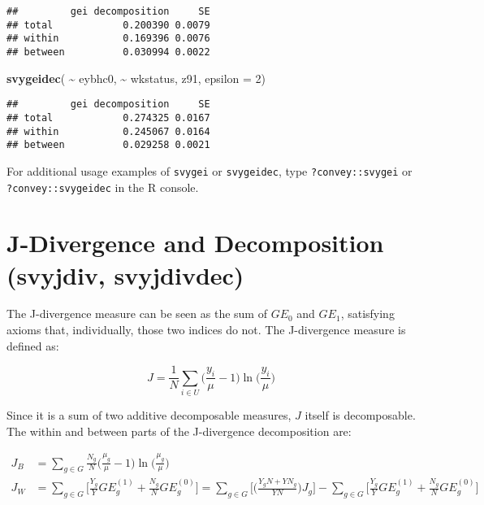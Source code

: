 \documentclass[
]{book}
\newenvironment{Shaded}{\begin{snugshade}}{\end{snugshade}}
\newcommand{\AttributeTok}[1]{\textcolor[rgb]{0.13,0.29,0.53}{#1}}
\newcommand{\DecValTok}[1]{\textcolor[rgb]{0.00,0.00,0.81}{#1}}
\newcommand{\FunctionTok}[1]{\textcolor[rgb]{0.13,0.29,0.53}{\textbf{#1}}}
\newcommand{\NormalTok}[1]{#1}
\newcommand{\SpecialCharTok}[1]{\textcolor[rgb]{0.81,0.36,0.00}{\textbf{#1}}}
\begin{document}
\begin{verbatim}
##         gei decomposition     SE
## total            0.200390 0.0079
## within           0.169396 0.0076
## between          0.030994 0.0022
\end{verbatim}

\begin{Shaded}
\begin{Highlighting}[]
\FunctionTok{svygeidec}\NormalTok{( }\SpecialCharTok{\textasciitilde{}}\NormalTok{ eybhc0, }\SpecialCharTok{\textasciitilde{}}\NormalTok{ wkstatus, z91, }\AttributeTok{epsilon =} \DecValTok{2}\NormalTok{)}
\end{Highlighting}
\end{Shaded}

\begin{verbatim}
##         gei decomposition     SE
## total            0.274325 0.0167
## within           0.245067 0.0164
## between          0.029258 0.0021
\end{verbatim}

For additional usage examples of \texttt{svygei} or \texttt{svygeidec}, type \texttt{?convey::svygei} or \texttt{?convey::svygeidec} in the R console.

\hypertarget{j-divergence-and-decomposition-svyjdiv-svyjdivdec}{%
\section{J-Divergence and Decomposition (svyjdiv, svyjdivdec)}\label{j-divergence-and-decomposition-svyjdiv-svyjdivdec}}

The J-divergence measure \autocite{rohde2016} can be seen as the sum of \(GE_0\) and \(GE_1\), satisfying axioms that, individually, those two indices do not. The J-divergence measure is defined as:

\[
J = \frac{1}{N} \sum_{i \in U} \bigg( \frac{ y_i }{ \mu } -1 \bigg) \ln \bigg( \frac{y_i}{\mu} \bigg) 
\]

Since it is a sum of two additive decomposable measures, \(J\) itself is decomposable. The within and between parts of the J-divergence decomposition are:

\[
\begin{aligned}
J_B &= \sum_{g \in G} \frac{N_g}{N} \bigg( \frac{ \mu_g }{ \mu } - 1 \bigg) \ln \bigg( \frac{\mu_g}{\mu} \bigg) \\
J_W &= \sum_{g \in G} \bigg[ \frac{Y_g}{Y} GE^{(1)}_g + \frac{N_g}{N} GE^{(0)}_g  \bigg] = \sum_{g \in G} \bigg[ \bigg( \frac{Y_g N + YN_g}{YN} \bigg) J_g  \bigg] -
\sum_{g \in G} \bigg[ \frac{Y_g}{Y} GE^{(1)}_g + \frac{N_g}{N} GE^{(0)}_g  \bigg] \end{aligned}
\]
\end{document}

